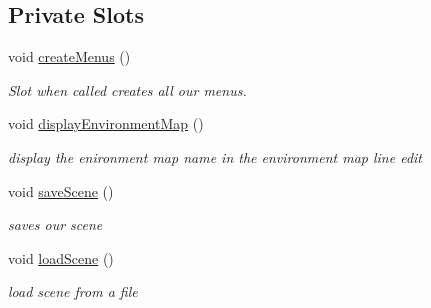 \subsection*{Private Slots}
\begin{DoxyCompactItemize}
\item 
\hypertarget{class_main_window_aa4907b0251d305659e403c62921ef331}{void \hyperlink{class_main_window_aa4907b0251d305659e403c62921ef331}{create\-Menus} ()}\label{class_main_window_aa4907b0251d305659e403c62921ef331}

\begin{DoxyCompactList}\small\item\em Slot when called creates all our menus. \end{DoxyCompactList}\item 
\hypertarget{class_main_window_a392404296e4eb0b29ace84edbc6130b8}{void \hyperlink{class_main_window_a392404296e4eb0b29ace84edbc6130b8}{display\-Environment\-Map} ()}\label{class_main_window_a392404296e4eb0b29ace84edbc6130b8}

\begin{DoxyCompactList}\small\item\em display the enironment map name in the environment map line edit \end{DoxyCompactList}\item 
\hypertarget{class_main_window_a8c5c70395af911e771dbf61da52169ab}{void \hyperlink{class_main_window_a8c5c70395af911e771dbf61da52169ab}{save\-Scene} ()}\label{class_main_window_a8c5c70395af911e771dbf61da52169ab}

\begin{DoxyCompactList}\small\item\em saves our scene \end{DoxyCompactList}\item 
\hypertarget{class_main_window_abc2541016866f91904cb3aa64ca85a06}{void \hyperlink{class_main_window_abc2541016866f91904cb3aa64ca85a06}{load\-Scene} ()}\label{class_main_window_abc2541016866f91904cb3aa64ca85a06}

\begin{DoxyCompactList}\small\item\em load scene from a file \end{DoxyCompactList}\end{DoxyCompactItemize}

